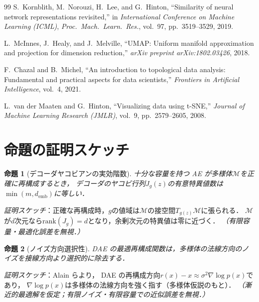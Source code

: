 \documentclass[11pt,a4paper]{jsarticle}
\newtheorem{proposition}{命題}
\newcommand{\Jg}{J_g}
\newcommand{\demb}{d_{\mathrm{emb}}}
\begin{document}
\begin{thebibliography}{99}
S.~Kornblith, M.~Norouzi, H.~Lee, and G.~Hinton,
``Similarity of neural network representations revisited,''
in \textit{International Conference on Machine Learning (ICML)},
\textit{Proc.~Mach.~Learn.~Res.}, vol.~97, pp.~3519--3529, 2019.

L.~McInnes, J.~Healy, and J.~Melville,
``UMAP: Uniform manifold approximation and projection for dimension reduction,''
\textit{arXiv preprint arXiv:1802.03426}, 2018.

F.~Chazal and B.~Michel,
``An introduction to topological data analysis: Fundamental and practical aspects
for data scientists,''
\textit{Frontiers in Artificial Intelligence}, vol.~4, 2021.

L.~van der Maaten and G.~Hinton,
``Visualizing data using t-SNE,''
\textit{Journal of Machine Learning Research (JMLR)}, vol.~9,
pp.~2579--2605, 2008.

\end{thebibliography}

\appendix

\section{命題の証明スケッチ}\label{app:proofs}

\begin{proposition}[デコーダヤコビアンの実効階数]\label{thm:rank}
十分な容量を持つ AE が多様体$\mathcal{M}$を正確に再構成するとき，
デコーダのヤコビ行列$\Jg(z)$の有意特異値数は$\min(m, \demb)$に等しい．
\end{proposition}
\textit{証明スケッチ}：正確な再構成時，$g$の値域は$\mathcal{M}$の接空間$T_{g(z)}\mathcal{M}$に張られる．
$\mathcal{M}$が$d$次元なら$\mathrm{rank}(\Jg) = d$となり，余剰次元の特異値は零に近づく．
\textit{（有限容量・最適化誤差を無視．）}

\begin{proposition}[ノイズ方向選択性]\label{thm:nsr}
DAE の最適再構成関数は，多様体の法線方向のノイズを接線方向より選択的に除去する．
\end{proposition}
\textit{証明スケッチ}：Alain ら\cite{alain2014dae}より，
DAE の再構成方向$r(x) - x \approx \sigma^2 \nabla\log p(x)$であり，
$\nabla\log p(x)$は多様体の法線方向を強く指す（多様体仮説のもと）．
\textit{（漸近的最適解を仮定；有限ノイズ・有限容量での近似誤差を無視．）}
\end{document}
